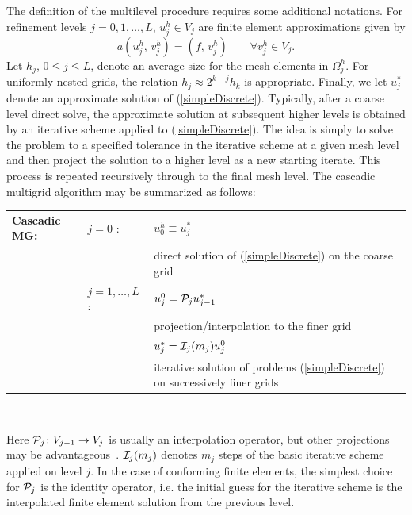 The definition of the multilevel procedure requires some additional
notations. For refinement levels $j=0,1,\ldots,L$, $u_j^h \in V_j$ are
finite element approximations given by
\begin{equation}
     \label{simpleDiscrete}
        a(u_j^h,\, v_j^h) = (f,\, v_j^h) \qquad \forall v_j^h \in V_j.
\end{equation}
Let $h_j$, $0\le j \le L$, denote an average size for the mesh elements
in
$\Omega_j^h$. For uniformly
nested grids, the relation $h_j \approx 2^{k-j} h_k$ is appropriate.
Finally, we let $u_j^*$ denote an approximate solution of
(\ref{simpleDiscrete}). Typically, after a coarse level direct solve,
the
approximate solution at subsequent higher levels is obtained by an
iterative scheme applied to (\ref{simpleDiscrete}). The idea is simply
to
solve the problem to a specified tolerance in the iterative scheme at a
given mesh level and then project the solution to a higher level as a
new
starting iterate. This process is repeated recursively through to the
final
mesh level.
The cascadic multigrid algorithm
may be summarized as follows:\vspace*{2mm}

\noindent
{\it
   \begin{tabular}{llp{80mm}}
     {\bf Cascadic MG:} & $j=0$ : &  $u_0^h \equiv u_j^*$ \\
                        &         &  direct solution of
                        (\ref{simpleDiscrete}) on the coarse
grid\\[0.9ex]
%
                        &$j=1,\ldots, L$ : & $u_j^0={\cal P}_j u_{j-1}^*$\\
                        &         & projection/interpolation to the finer grid
\\[.9ex]
%
                        &         & $u_j^*={\cal I}_j(m_j) u_{j}^0$\\
                        &         & iterative solution of problems
                        (\ref{simpleDiscrete}) on successively finer
                        grids \\[1.9ex]
   \end{tabular}\\
}
Here ${\cal P}_j\colon V_{j-1} \to V_j$ is usually an interpolation operator, but other projections may be advantageous~\cite{CarSea85}.
${\cal I}_j(m_j)$ denotes $m_j$ steps of the basic iterative scheme
applied on level $j$. In the case of conforming finite elements, the
simplest choice for ${\cal P}_j$ is the identity operator, i.e.
the initial guess for the iterative scheme is
the interpolated finite element solution from the previous level.

